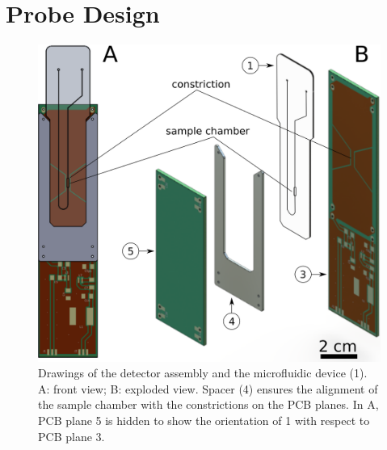 \documentclass[preprint,5p]{elsarticle}
\begin{document}
\section{Probe Design}
\label{sec:probe-design}
\begin{figure}
\centering
\includegraphics[width=.8\linewidth,keepaspectratio=true]{./figures/ms5n17-tlp-im-190205-rf-device-assembly.png}
\caption{Drawings of the detector assembly and the microfluidic device (1). A: front view; B: exploded view. Spacer (4) ensures the alignment of the sample chamber with the constrictions on the PCB planes. In A, PCB plane 5 is hidden to show the orientation of 1 with respect to PCB plane 3.}
\label{fig:rf-device-assembly}
\end{figure}
\end{document}
